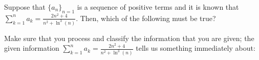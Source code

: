 \documentclass{ximera}
\author{Jim Talamo}
\begin{document}
\begin{exercise}
Suppose that $\{a_n\}_{n=1}$ is a sequence of positive terms and it is known that $\sum_{k=1}^{n} a_k = \frac{2n^2+4}{n^2+\ln^3(n)}$.  Then, which of the following must be true?

\begin{selectAll}
\end{selectAll}

\begin{hint}
Make sure that you process and classify the information that you are given;  the given information $\sum_{k=1}^{n} a_k = \frac{2n^2+4}{n^2+\ln^3(n)}$ tells us something immediately about:

\begin{multipleChoice}
\end{multipleChoice}
\end{hint}
\end{exercise}
\end{document}
